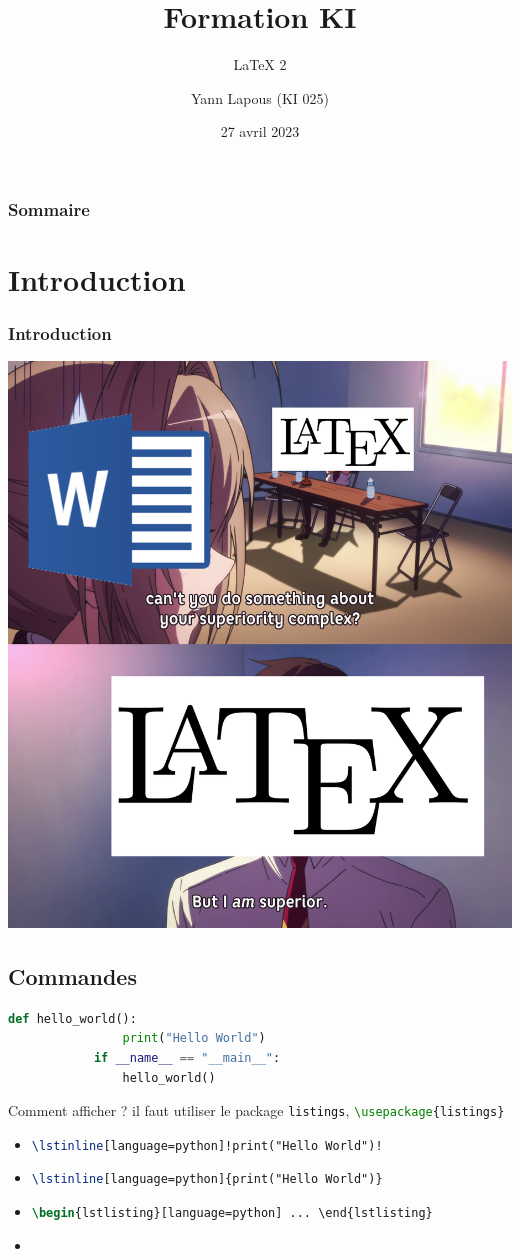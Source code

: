 \documentclass{beamer}
\title{Formation KI} %
\subtitle{LaTeX 2} %
\author{Yann Lapous (KI 025)}
\date{27 avril 2023}
\begin{document}
    \begin{frame}
        \titlepage
    \end{frame}

    \begin{frame}
        \frametitle{Sommaire}
        \setcounter{tocdepth}{1}
        \tableofcontents
    \end{frame}
    \section*{Introduction}
    \begin{frame}
        \frametitle{Introduction}
        \centering
        \includegraphics[width=.5\textwidth]{assets/image1.png}
    \end{frame}
    \subsection{Commandes}
    \begin{frame} [allowframebreaks=1,fragile,t]
        \begin{lstlisting}[language=python]
            def hello_world():
                print("Hello World")
            if __name__ == "__main__":
                hello_world()
        \end{lstlisting}
        \begin{block}{Comment afficher ?}
            il faut utiliser le package \texttt{listings}, \lstinline[language=tex]!\usepackage{listings}!
            \begin{itemize}
            \item \lstinline[language=tex]{\lstinline[language=python]!print("Hello World")!} 
            \item \lstinline[language=tex]!\lstinline[language=python]{print("Hello World")}!
            \item \lstinline[language=tex]!\begin{lstlisting}[language=python] ... \end{lstlisting}!
            \item \lstinline[language=tex]!!
            \end{itemize}
        \end{block}
    \end{frame}
\end{document}
